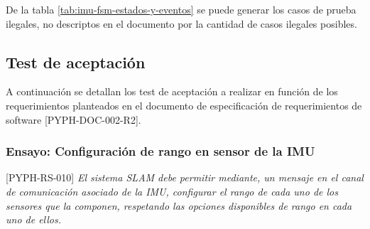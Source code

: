 \documentclass[
11pt, %
codirector, %
]{simple_charter}
\begin{document}
De la tabla \ref{tab:imu-fsm-estados-y-eventos} se puede generar los casos de prueba ilegales,
no descriptos en el documento por la cantidad de casos ilegales posibles.










\subsection{Test de aceptación}
\label{ssec:test-de-aceptacion}

A continuación se detallan los test de aceptación a realizar en función de los requerimientos
planteados en el documento de especificación de requerimientos de software [PYPH-DOC-002-R2].

\subsubsection{Ensayo: Configuración de rango en sensor de la IMU}
\label{sssec:ensayo-configuracion-de-rango-en-sensor-de-la-imu}

[PYPH-RS-010] \textit{El sistema SLAM debe permitir mediante, un mensaje en el canal de comunicación
asociado de la IMU, configurar el rango de cada uno de los sensores que la componen, respetando las
opciones disponibles de rango en cada uno de ellos.}
\end{document}
